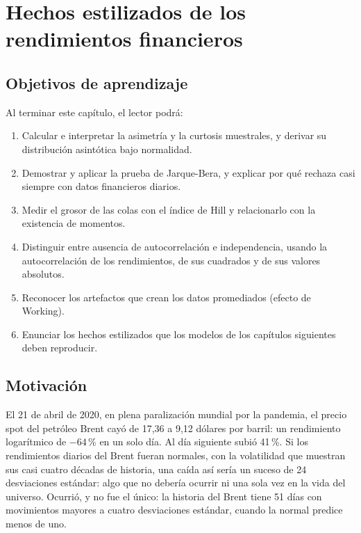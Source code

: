 \chapter{Hechos estilizados de los rendimientos financieros}\label{cap:hechos}

\section*{Objetivos de aprendizaje}
Al terminar este capítulo, el lector podrá:
\begin{enumerate}[label=\arabic*.,leftmargin=*]
  \item Calcular e interpretar la asimetría y la curtosis muestrales, y derivar su distribución asintótica
        bajo normalidad.
  \item Demostrar y aplicar la prueba de Jarque-Bera, y explicar por qué rechaza casi siempre con datos
        financieros diarios.
  \item Medir el grosor de las colas con el índice de Hill y relacionarlo con la existencia de momentos.
  \item Distinguir entre ausencia de autocorrelación e independencia, usando la autocorrelación de los
        rendimientos, de sus cuadrados y de sus valores absolutos.
  \item Reconocer los artefactos que crean los datos promediados (efecto de Working).
  \item Enunciar los hechos estilizados que los modelos de los capítulos siguientes deben reproducir.
\end{enumerate}

\section*{Motivación}
El 21 de abril de 2020, en plena paralización mundial por la pandemia, el precio spot del petróleo Brent
cayó de 17,36 a 9,12 dólares por barril: un rendimiento logarítmico de $-64$\,\% en un solo día. Al día
siguiente subió 41\,\%. Si los rendimientos diarios del Brent fueran normales, con la volatilidad que
muestran sus casi cuatro décadas de historia, una caída así sería un suceso de 24 desviaciones estándar:
algo que no debería ocurrir ni una sola vez en la vida del universo. Ocurrió, y no fue el único: la
historia del Brent tiene 51 días con movimientos mayores a cuatro desviaciones estándar, cuando la
normal predice menos de uno.

